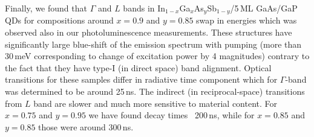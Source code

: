 Finally, we found that $\Gamma$ and $L$ bands in In$_{1-x}$Ga$_x$As$_y$Sb$_{1-y}$/5$\,$ML GaAs/GaP QDs for compositions around $x=0.9$ and $y=0.85$ swap in energies which was observed also in our photoluminescence measurements. These structures have significantly large blue-shift of the emission spectrum with pumping (more than 30$\,$meV corresponding to change of excitation power by 4 magnitudes) contrary to the fact that they have type-I (in direct space) band alignment. Optical transitions for these samples differ in radiative time component which for $\Gamma$-band was determined to be around 25$\,$ns. The indirect (in reciprocal-space) transitions from $L$ band are slower and much more sensitive to material content. For $x=0.75$ and $y=0.95$ we have found decay times ~200$\,$ns, while for $x=0.85$ and $y=0.85$ those were around 300$\,$ns.


\newpage

\newpage 